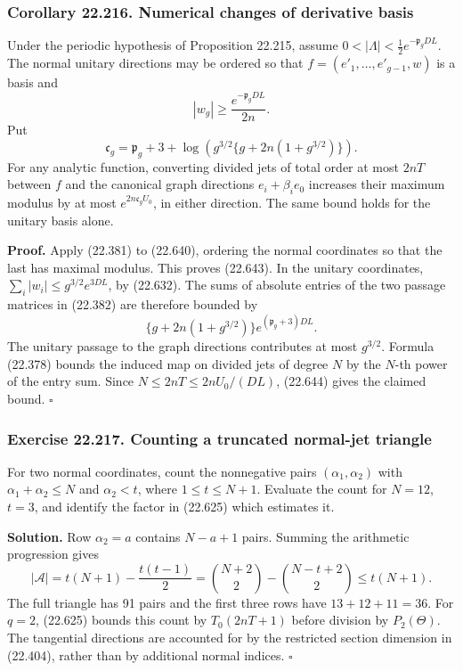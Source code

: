 \documentclass[
  11pt,
  a4paper,
]{article}
\begin{document}
\subsubsection{Corollary 22.216. Numerical changes of derivative
basis}\label{corollary-22.216.-numerical-changes-of-derivative-basis}

Under the periodic hypothesis of Proposition 22.215, assume
\(0<|\Lambda|<\tfrac12e^{-\mathfrak p_gDL}\). The normal unitary
directions may be ordered so that \(f=(e'_1,\ldots,e'_{g-1},w)\) is a
basis and \[
 |w_g|\ge\frac{e^{-\mathfrak p_gDL}}{2n}.
 \tag{22.643}
\] Put \[
 \mathfrak c_g=\mathfrak p_g+3+
  \log\left(g^{3/2}\{g+2n(1+g^{3/2})\}\right).
 \tag{22.644}
\] For any analytic function, converting divided jets of total order at
most \(2nT\) between \(f\) and the canonical graph directions
\(e_i+\beta_i e_0\) increases their maximum modulus by at most
\(e^{2n\mathfrak c_gU_0}\), in either direction. The same bound holds
for the unitary basis alone.

\textbf{Proof.} Apply (22.381) to (22.640), ordering the normal
coordinates so that the last has maximal modulus. This proves (22.643).
In the unitary coordinates, \(\sum_i|w_i|\le g^{3/2}e^{3DL}\), by
(22.632). The sums of absolute entries of the two passage matrices in
(22.382) are therefore bounded by \[
 \{g+2n(1+g^{3/2})\}e^{(\mathfrak p_g+3)DL}.
 \tag{22.645}
\] The unitary passage to the graph directions contributes at most
\(g^{3/2}\). Formula (22.378) bounds the induced map on divided jets of
degree \(N\) by the \(N\)-th power of the entry sum. Since
\(N\le2nT\le2nU_0/(DL)\), (22.644) gives the claimed bound. \(\square\)

\subsubsection{Exercise 22.217. Counting a truncated normal-jet
triangle}\label{exercise-22.217.-counting-a-truncated-normal-jet-triangle}

For two normal coordinates, count the nonnegative pairs
\((\alpha_1,\alpha_2)\) with \(\alpha_1+\alpha_2\le N\) and
\(\alpha_2<t\), where \(1\le t\le N+1\). Evaluate the count for
\(N=12\), \(t=3\), and identify the factor in (22.625) which estimates
it.

\textbf{Solution.} Row \(\alpha_2=a\) contains \(N-a+1\) pairs. Summing
the arithmetic progression gives \[
 |\mathcal A|=t(N+1)-\frac{t(t-1)}2
       =\binom{N+2}{2}-\binom{N-t+2}{2}\le t(N+1).
 \tag{22.646}
\] The full triangle has 91 pairs and the first three rows have
\(13+12+11=36\). For \(q=2\), (22.625) bounds this count by
\(T_0(2nT+1)\) before division by \(P_2(\Theta)\). The tangential
directions are accounted for by the restricted section dimension in
(22.404), rather than by additional normal indices. \(\square\)
\end{document}
